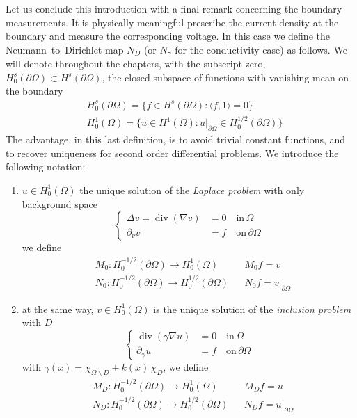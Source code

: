 \documentclass[10pt, a4paper, twoside, openright]{book}
\theoremstyle{definition}
\theoremstyle{plain}
\theoremstyle{plain}
\theoremstyle{plain}
\theoremstyle{plain}
\theoremstyle{plain}
\theoremstyle{plain}
\theoremstyle{plain}
\theoremstyle{plain}
\DeclareMathOperator{\divergence}{div}
\begin{document}
Let us conclude this introduction with a final remark concerning the boundary measurements.
It is physically meaningful prescribe the current density at the boundary and measure the corresponding voltage.
In this case we define the Neumann--to--Dirichlet map $N_D$ (or $N_\gamma$ for the conductivity case) as follows.
We will denote throughout the chapters, with the subscript zero, $H^s_0(\partial\Omega)\subset H^s(\partial\Omega)$, the closed subspace of functions with vanishing mean on the boundary
\begin{align}
&H^s_0(\partial\Omega) = \Big\{ f \in H^s(\partial\Omega): \langle f,1\rangle = 0\Big\}\\
&H^1_0(\Omega) = \Big\{ u \in H^1(\Omega): u|_{\partial\Omega} \in H^{1/2}_0(\partial\Omega)\Big\}
\end{align}
The advantage, in this last definition, is to avoid trivial constant functions, and to recover uniqueness for second order differential problems.
We introduce the following notation:
\begin{enumerate}
 \item $u\in H^1_0(\Omega)$ the unique solution of the \emph{Laplace problem} with only background space
 \begin{equation}
 \label{eq:NtoD-laplace}
  \left\{
  \begin{aligned}
  \Delta v = \divergence(\nabla v) &= 0 \quad\text{in}\,\Omega \\
            \partial_\nu v &= f \quad\text{on}\,\partial \Omega
  \end{aligned}
  \right.
 \end{equation}
 we define
 \begin{align}
 &M_0: H^{-1/2}_0(\partial \Omega) \to H^1_0(\Omega) && M_0f = v \label{eq:def-T_0}\\
 &{N_0}: H^{-1/2}_0(\partial \Omega) \to H^{1/2}_0(\partial\Omega) && {N_0} f = v|_{\partial\Omega}
 \end{align}
 \item at the same way, $v\in H^1_0(\Omega)$ is the unique solution of the \emph{inclusion problem} with $D$
 \begin{equation}
 \label{eq:NtoD-inclusion}
  \left\{
  \begin{aligned}
  \divergence(\gamma\nabla u) &= 0 \quad\text{in}\,\Omega \\
            \partial_\gamma u &= f \quad\text{on}\,\partial \Omega
  \end{aligned}
  \right.
 \end{equation}
 with $\gamma(x) = \chi_{\Omega\backslash\overline{D}} + k(x)\,\chi_D$, we define
 \begin{align}
 &M_D: H^{-1/2}_0(\partial \Omega) \to H^1_0(\Omega) && M_Df = u \label{eq:def-T_D}\\
 &{N_D}: H^{-1/2}_0(\partial \Omega) \to H^{1/2}_0(\partial\Omega) && {N_D}f = u|_{\partial\Omega}
 \end{align}
\end{enumerate}
\end{document}
